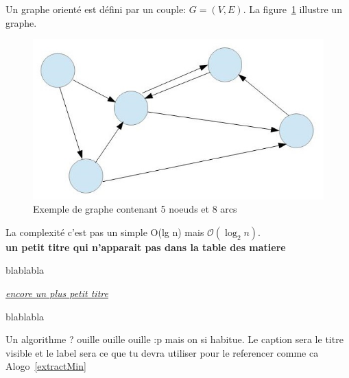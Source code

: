 \documentclass[12pt,a4paper,final]{article}
\newcommand{\smalltitle}[1]{\bigskip\large\textbf{#1}\par\normalsize\medskip}
\newcommand{\partitle}[1]{\bigskip\textit{\underline{#1}}\par\medskip}
\begin{document}
Un graphe orienté est défini par un couple: $G=(V,E)$.
La figure~\ref{graphExample} illustre un graphe.

\begin{figure}
	\centering
	\includegraphics[width=\textwidth]{images/Graph.jpg}
	\caption{\label{graphExample}Exemple de graphe contenant 5 noeuds et 8 arcs}
\end{figure}


La complexité c'est pas un simple O(lg n) mais $\mathcal{O}(\log_2 n)$.\\

\smalltitle{un petit titre qui n'apparait pas dans la table des matiere}
blablabla

\partitle{encore un plus petit titre}
blablabla

Un algorithme ? ouille ouille ouille :p mais on si habitue. Le caption sera le titre visible et le label sera ce que tu devra utiliser pour le referencer comme ca Alogo~\ref{extractMin}


\end{document}
